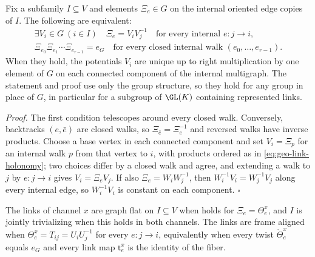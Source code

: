 \label{prop:gauss-coboundary-trivialization}
Fix a subfamily $I\subseteq V$ and elements $\Xi_e\in G$ on the internal oriented edge copies of $I$.
The following are equivalent:
\begin{equation}
\begin{gathered}
\exists V_i\in G\ (i\in I)
\quad
\Xi_e=V_iV_j^{-1}
\quad\text{for every internal }e:j\to i,\\
\Xi_{e_0}\Xi_{e_1}\cdots\Xi_{e_{r-1}}=e_G
\quad\text{for every closed internal walk }(e_0,\ldots,e_{r-1}).
\end{gathered}
\label{eq:geo-trivializing-criterion}
\end{equation}
When they hold, the potentials $V_i$ are unique up to right multiplication by one element of $G$ on
each connected component of the internal multigraph. The statement and proof use only the group
structure, so they hold for any group in place of $G$, in particular for a subgroup of $\GL(K)$
containing represented links. 

\noindent\emph{Proof.}
The first condition telescopes around every closed walk. Conversely, backtracks
$(e,\bar e)$ are closed walks, so $\Xi_{\bar e}=\Xi_e^{-1}$ and reversed walks have inverse products.
Choose a base vertex in each connected component and set $V_i=\Xi_{p}$ for an internal walk $p$ from
that vertex to $i$, with products ordered as in \eqref{eq:geo-link-holonomy}; two choices differ by a
closed walk and agree, and extending a walk to $j$ by $e:j\to i$ gives $V_i=\Xi_eV_j$. If also
$\Xi_e=W_iW_j^{-1}$, then $W_i^{-1}V_i=W_j^{-1}V_j$ along every internal edge, so $W_i^{-1}V_i$ is
constant on each component. \hfill$\square$

The links of channel $x$ are graph flat on $I\subseteq V$ when 
holds for $\Xi_e=\Theta_e^x$, and $I$ is jointly trivializing when this holds in both channels. The
links are frame aligned\label{hyp:geo-flat-links} when $\Theta_e^x=T_{ij}=U_iU_j^{-1}$ for every
$e:j\to i$,\label{eq:geo-flat-regime} equivalently when every twist $\mathring\Theta_e^x$ equals $e_G$
and every link map $\mathsf t_e^x$ is the identity of the fiber.


